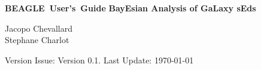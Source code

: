 \begin{titlepage}
   \flushright
   \begin{minipage}{0.6\linewidth}
      \flushright
      \vskip 1cm
      {\huge \textbf{BEAGLE~User's~Guide}}
      \vskip 1cm
      \Large
                  {\bf BayEsian Analysis of GaLaxy sEds} \\
      \vskip 2cm

    	\large Jacopo Chevallard  \\[0.2cm] Stephane Charlot
      
   \end{minipage}
   \vfill
   \dblrule
   \flushright
   Version Issue: Version 0.1. Last Update: \today
\end{titlepage}
